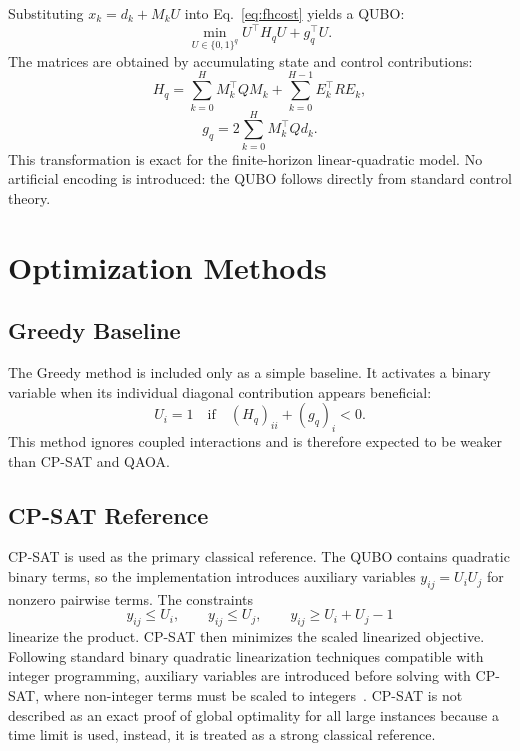 \documentclass[runningheads]{llncs}
\begin{document}
Substituting $x_k=d_k+M_kU$ into Eq.~\eqref{eq:fhcost} yields a QUBO:
\begin{equation}
\min_{U\in\{0,1\}^{q}}
U^\top H_q U+g_q^\top U.
\label{eq:qubo}
\end{equation}
The matrices are obtained by accumulating state and control contributions:
\begin{equation}
H_q =
\sum_{k=0}^{H} M_k^\top Q M_k
+
\sum_{k=0}^{H-1}E_k^\top R E_k,
\end{equation}
\begin{equation}
g_q =
2\sum_{k=0}^{H}M_k^\top Qd_k.
\end{equation}
This transformation is exact for the finite-horizon linear-quadratic model. No artificial encoding is introduced: the QUBO follows directly from standard control theory.

\section{Optimization Methods}

\subsection{Greedy Baseline}

The Greedy method is included only as a simple baseline. It activates a binary variable when its individual diagonal contribution appears beneficial:
\begin{equation}
U_i=1 \quad \mathrm{if} \quad (H_q)_{ii}+(g_q)_i<0.
\end{equation}
This method ignores coupled interactions and is therefore expected to be weaker than CP-SAT and QAOA.

\subsection{CP-SAT Reference}

CP-SAT is used as the primary classical reference. The QUBO contains quadratic binary terms, so the implementation introduces auxiliary variables $y_{ij}=U_iU_j$ for nonzero pairwise terms. The constraints
\begin{equation}
y_{ij}\leq U_i,\qquad y_{ij}\leq U_j,\qquad y_{ij}\geq U_i+U_j-1
\end{equation}
linearize the product. CP-SAT then minimizes the scaled linearized objective. Following standard binary quadratic linearization techniques compatible with integer programming, auxiliary variables are introduced before solving with CP-SAT, where non-integer terms must be scaled to integers~\cite{ortoolsdoc}. CP-SAT is not described as an exact proof of global optimality for all large instances because a time limit is used, instead, it is treated as a strong classical reference.
\end{document}

